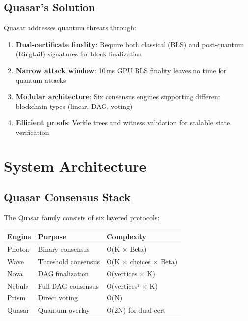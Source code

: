 \documentclass[11pt]{article}
\begin{document}
\subsection{Quasar's Solution}

Quasar addresses quantum threats through:
\begin{enumerate}
\item \textbf{Dual-certificate finality}: Require both classical (BLS) and post-quantum (Ringtail) signatures for block finalization
\item \textbf{Narrow attack window}: 10\,ms GPU BLS finality leaves no time for quantum attacks
\item \textbf{Modular architecture}: Six consensus engines supporting different blockchain types (linear, DAG, voting)
\item \textbf{Efficient proofs}: Verkle trees and witness validation for scalable state verification
\end{enumerate}

\section{System Architecture}

\subsection{Quasar Consensus Stack}

The Quasar family consists of six layered protocols:

\begin{table}[h]
\centering
\begin{tabular}{@{}lll@{}}
\toprule
\textbf{Engine} & \textbf{Purpose} & \textbf{Complexity} \\
\midrule
Photon & Binary consensus & O(K $\times$ Beta) \\
Wave & Threshold consensus & O(K $\times$ choices $\times$ Beta) \\
Nova & DAG finalization & O(vertices $\times$ K) \\
Nebula & Full DAG consensus & O(vertices² $\times$ K) \\
Prism & Direct voting & O(N) \\
Quasar & Quantum overlay & O(2N) for dual-cert \\
\bottomrule
\end{tabular}

\label{tab:engines}
\end{table}
\end{document}
